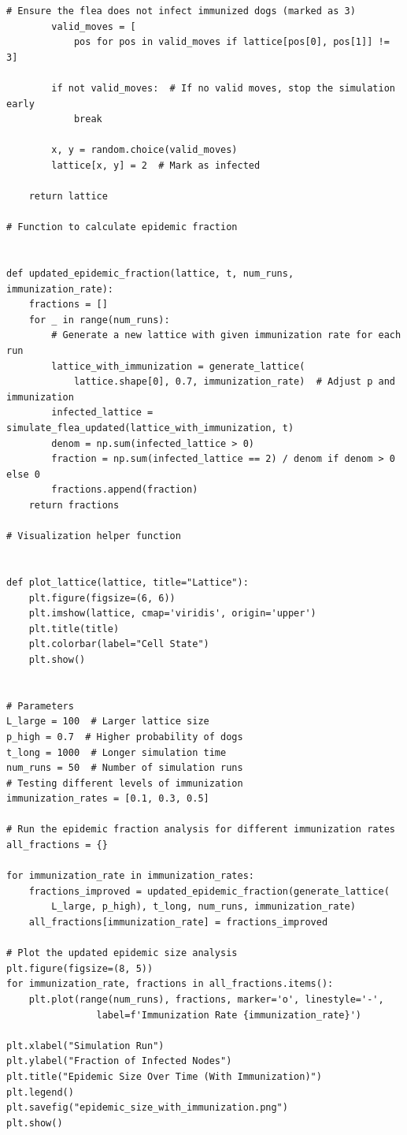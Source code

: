 \documentclass[10pt,letterpaper, onecolumn]{report}
\begin{document}
\begin{flushleft}
\begin{flushleft}
\begin{lstlisting}[style=myPythonStyle, caption={Flea on the very left dog}]
        # Ensure the flea does not infect immunized dogs (marked as 3)
        valid_moves = [
            pos for pos in valid_moves if lattice[pos[0], pos[1]] != 3]

        if not valid_moves:  # If no valid moves, stop the simulation early
            break

        x, y = random.choice(valid_moves)
        lattice[x, y] = 2  # Mark as infected

    return lattice

# Function to calculate epidemic fraction


def updated_epidemic_fraction(lattice, t, num_runs, immunization_rate):
    fractions = []
    for _ in range(num_runs):
        # Generate a new lattice with given immunization rate for each run
        lattice_with_immunization = generate_lattice(
            lattice.shape[0], 0.7, immunization_rate)  # Adjust p and immunization
        infected_lattice = simulate_flea_updated(lattice_with_immunization, t)
        denom = np.sum(infected_lattice > 0)
        fraction = np.sum(infected_lattice == 2) / denom if denom > 0 else 0
        fractions.append(fraction)
    return fractions

# Visualization helper function


def plot_lattice(lattice, title="Lattice"):
    plt.figure(figsize=(6, 6))
    plt.imshow(lattice, cmap='viridis', origin='upper')
    plt.title(title)
    plt.colorbar(label="Cell State")
    plt.show()


# Parameters
L_large = 100  # Larger lattice size
p_high = 0.7  # Higher probability of dogs
t_long = 1000  # Longer simulation time
num_runs = 50  # Number of simulation runs
# Testing different levels of immunization
immunization_rates = [0.1, 0.3, 0.5]

# Run the epidemic fraction analysis for different immunization rates
all_fractions = {}

for immunization_rate in immunization_rates:
    fractions_improved = updated_epidemic_fraction(generate_lattice(
        L_large, p_high), t_long, num_runs, immunization_rate)
    all_fractions[immunization_rate] = fractions_improved

# Plot the updated epidemic size analysis
plt.figure(figsize=(8, 5))
for immunization_rate, fractions in all_fractions.items():
    plt.plot(range(num_runs), fractions, marker='o', linestyle='-',
                label=f'Immunization Rate {immunization_rate}')

plt.xlabel("Simulation Run")
plt.ylabel("Fraction of Infected Nodes")
plt.title("Epidemic Size Over Time (With Immunization)")
plt.legend()
plt.savefig("epidemic_size_with_immunization.png")
plt.show()


\end{lstlisting}
\end{flushleft}
\end{flushleft}
\end{document}
